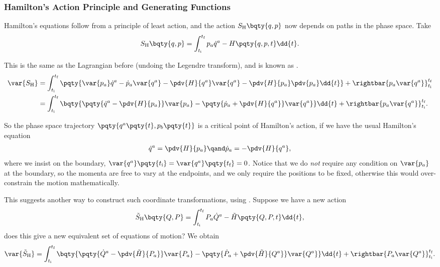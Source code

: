 \subsubsection{Hamilton's Action Principle and Generating Functions}

Hamilton's equations follow from a principle of least action, and the action \(S_{\text{H}}\bqty{q, p}\) now depends on paths in the phase space. Take
\begin{equation}
    S_{\text{H}}\bqty{q, p} = \int_{t_{\text{i}}}^{t_{\text{f}}} p_a \dot{q}^a - H\pqty{q, p, t} \dd{t}.
\end{equation}

This is the same as the Lagrangian before (undoing the Legendre transform), and is known as .
\begin{subequations}
    \begin{align}
        \var{S_{\text{H}}} &= \int_{t_{\text{i}}}^{t_{\text{f}}} \pqty{\var{p_a} \dot{q}^a - \dot{p}_a \var{q^a} - \pdv{H}{q^a} \var{q^a} - \pdv{H}{p_a} \pdv{p_a} \dd{t}} + \rightbar{p_a \var{q^a}}_{t_{\text{i}}}^{t_{\text{f}}} \\
        &= \int_{t_{\text{i}}}^{t_{\text{f}}} \bqty{\pqty{\dot{q}^a - \pdv{H}{p_a}} \var{p_a} - \pqty{\dot{p}_a + \pdv{H}{q^a}} \var{q^a}} \dd{t} + \rightbar{p_a \var{q^a}}_{t_{\text{i}}}^{t_{\text{f}}}.
    \end{align}
\end{subequations}

So the phase space trajectory \(\pqty{q^a\pqty{t}, p_b\pqty{t}}\) is a critical point of Hamilton's action, if we have the usual Hamilton's equation
\begin{align}
    \dot{q}^a = \pdv{H}{p_a} \qand \dot{p}_a = - \pdv{H}{q^a},
\end{align}
where we insist on the boundary, \(\var{q^a}\pqty{t_{\text{i}}} = \var{q^a}\pqty{t_{\text{f}}} = 0\). Notice that we do \emph{not} require any condition on \(\var{p_a}\) at the boundary, so the momenta are free to vary at the endpoints, and we only require the positions to be fixed, otherwise this would over-constrain the motion mathematically.

This suggests another way to construct such coordinate transformations, using . Suppose we have a new action
\begin{equation}
    \tilde{S}_{\text{H}} \bqty{Q, P} = \int_{t_{\text{i}}}^{t_{\text{f}}} P_a \dot{Q}^a - \tilde{H}\pqty{Q, P, t} \dd{t},
\end{equation}
does this give a new equivalent set of equations of motion? We obtain
\begin{equation}
    \var{\tilde{S}_{\text{H}}} = \int_{t_{\text{i}}}^{t_{\text{f}}} \bqty{\pqty{\dot{Q}^a - \pdv{\tilde{H}}{P_a}} \var{P_a} - \pqty{\dot{P}_a + \pdv{\tilde{H}}{Q^a}} \var{Q^a}} \dd{t} + \rightbar{P_a \var{Q^a}}_{t_{\text{i}}}^{t_{\text{f}}}.
\end{equation}

